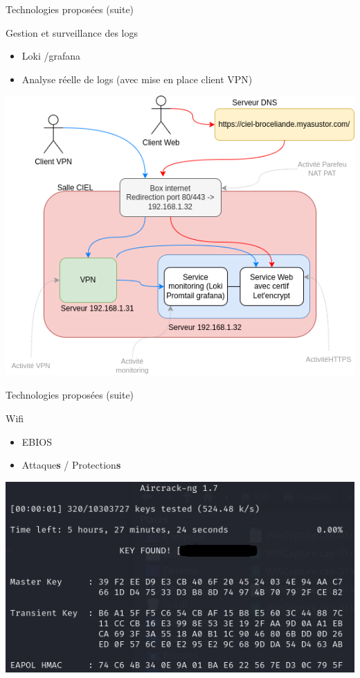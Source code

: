 \documentclass[12pt, handout]{beamer}
\begin{document}
\begin{frame}{Technologies proposées (suite)}

\begin{block}{Gestion et surveillance des logs}
\begin{itemize}
\item Loki /grafana
\item Analyse réelle de logs (avec mise en place client VPN)
\end{itemize}
\end{block}

\begin{center}
\includegraphics[scale=0.3]{./ressource/topoReseau.drawio.png}
\end{center}
\end{frame}


\begin{frame}{Technologies proposées (suite)}
\begin{block}{Wifi}
\begin{itemize}
\item EBIOS
\item Attaque\textbf{s} / Protection\textbf{s}
\end{itemize}
\end{block}

\begin{center}
\includegraphics[scale=0.4]{./ressource/clefTrouvee.png}
\end{center}
\end{frame}
\end{document}
